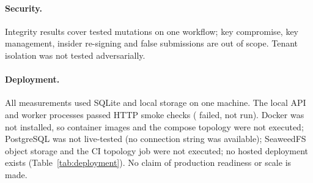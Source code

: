 \paragraph{Security.}
Integrity results cover  tested mutations on one workflow; key
compromise, key management, insider re-signing and false submissions are out of
scope. Tenant isolation was not tested adversarially.

\paragraph{Deployment.}
All measurements used SQLite and local storage on one machine. The local API and
worker processes passed  HTTP smoke checks ( failed,
 not run). Docker was not installed, so container images and the
compose topology were not executed; PostgreSQL was not live-tested (no connection
string was available); SeaweedFS object storage and the CI topology job were not
executed; no hosted deployment exists (Table~\ref{tab:deployment}). No claim of
production readiness or scale is made.

